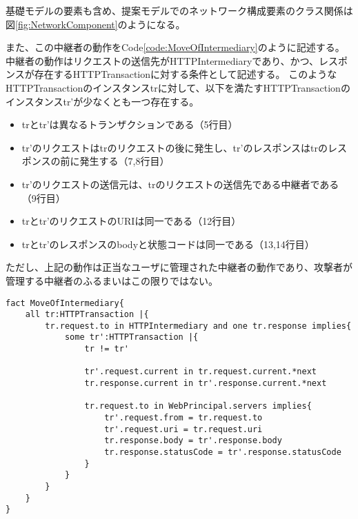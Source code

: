 \documentclass[journal]{IEEEtran}
\begin{document}
基礎モデルの要素も含め、提案モデルでのネットワーク構成要素のクラス関係は図\ref{fig:NetworkComponent}のようになる。


また、この中継者の動作をCode\ref{code:MoveOfIntermediary}のように記述する。
中継者の動作はリクエストの送信先がHTTPIntermediaryであり、かつ、レスポンスが存在するHTTPTransactionに対する条件として記述する。
このようなHTTPTransactionのインスタンスtrに対して、以下を満たすHTTPTransactionのインスタンスtr'が少なくとも一つ存在する。
\begin{itemize}
\item trとtr'は異なるトランザクションである（5行目）
\item tr'のリクエストはtrのリクエストの後に発生し、tr'のレスポンスはtrのレスポンスの前に発生する（7,8行目）
\item tr'のリクエストの送信元は、trのリクエストの送信先である中継者である（9行目）
\item trとtr'のリクエストのURIは同一である（12行目）
\item trとtr'のレスポンスのbodyと状態コードは同一である（13,14行目）
\end{itemize}
ただし、上記の動作は正当なユーザに管理された中継者の動作であり、攻撃者が管理する中継者のふるまいはこの限りではない。

\begin{lstlisting}[caption=中継者の動作, label=code:MoveOfIntermediary]
fact MoveOfIntermediary{
	all tr:HTTPTransaction |{
		tr.request.to in HTTPIntermediary and one tr.response implies{
			some tr':HTTPTransaction |{
				tr != tr'				
				
				tr'.request.current in tr.request.current.*next
				tr.response.current in tr'.response.current.*next

				tr.request.to in WebPrincipal.servers implies{
					tr'.request.from = tr.request.to
					tr'.request.uri = tr.request.uri
					tr.response.body = tr'.response.body
					tr.response.statusCode = tr'.response.statusCode
				}
			}
		}
	}
}
\end{lstlisting}

\end{document}
